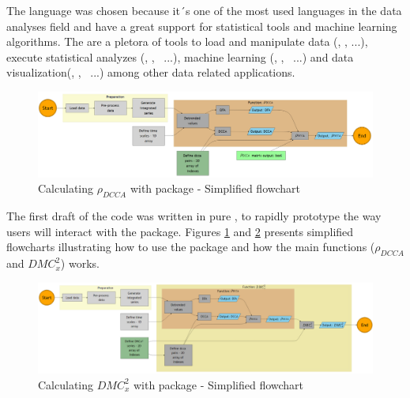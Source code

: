\documentclass[article]{jss}
\begin{document}
The  language was chosen because it´s one of the most used languages in the data analyses field and have a great support for statistical tools and machine learning algorithms. The are a pletora of tools to load and manipulate data (, ,  ...), execute statistical analyzes (, , ~...), machine learning (, , ~...) and data visualization(, , ~...) among other data related applications.

\begin{figure}[h!]
  \centering
  \includegraphics{./figs/pdcca_chart.png}
  \caption{\label{fig:pdcca_chart}Calculating  $\rho_{DCCA}$ with  package - Simplified flowchart}
\end{figure}

The first draft of the code was written in pure , to rapidly prototype the way users will interact with the package. Figures \ref{fig:pdcca_chart} and \ref{fig:dmc_chart} presents simplified flowcharts illustrating how to use the package and how the main functions ($\rho_{DCCA}$ and $DMC_x^2$) works.

\begin{figure}[h!]
  \centering
  \includegraphics{./figs/dmc_chart.png}
  \caption{\label{fig:dmc_chart}Calculating  $DMC_x^2$ with  package - Simplified flowchart}
\end{figure}
\end{document}
